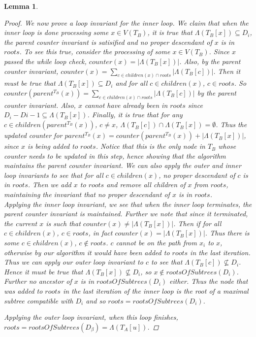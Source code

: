 \documentclass{article}
\newcommand{\leafset}{\Lambda}
\newtheorem{computerootsofsubtreescorrectness}[incompatibility]{Lemma}
\begin{document}
\begin{computerootsofsubtreescorrectness}
\begin{proof}
            We now prove a loop invariant for the inner loop. We claim that when the inner loop is done processing some $x \in V(T_B)$, it is true that $\leafset(T_B[x]) \subseteq D_i$, the parent counter invariant is satisified and no proper descendant of $x$ is in $roots$. To see this true, consider the processing of some $x \in V(T_B)$. Since $x$ passed the while loop check, $counter(x) = |\leafset(T_B[x])|$. Also, by the parent counter invariant, $counter(x) = \sum_{c \in children(x) \cap roots} |\leafset(T_B[c])|$. Then it must be true that $\leafset(T_B[x]) \subseteq D_i$ and for all $c \in children(x)$, $c \in roots$. So $counter(parent^{T_B}(x)) = \sum_{c \in children(x) \cap roots} |\leafset(T_B[c])|$ by the parent counter invariant. Also, $x$ cannot have already been in $roots$ since $D_i - D{i-1} \subseteq \leafset(T_B[x])$. Finally, it is true that for any $c \in children(parent^{T_B}(x))$, $c \neq x$, $\leafset(T_B[c]) \cap \leafset(T_B[x]) = \emptyset$. Thus the updated counter for $parent^{T_B}(x) = counter(parent^{T_B}(x)) + |\leafset(T_B[x])|$, since $x$ is being added to $roots$. Notice that this is the only node in $T_B$ whose counter needs to be updated in this step, hence showing that the algorithm maintains the parent counter invariant. We can also apply the outer and inner loop invariants to see that for all $c \in children(x)$, no proper descendant of $c$ is in $roots$. Then we add $x$ to $roots$ and remove all children of $x$ from $roots$, maintaining the invariant that no proper descendant of $x$ is in $roots$.\\

            Applying the inner loop invariant, we see that when the inner loop terminates, the parent counter invariant is maintained. Further we note that since it terminated, the current $x$ is such that $counter(x) \neq |\leafset(T_B[x])|$. Then if for all $c \in children(x)$, $c \in roots$, in fact $counter(x) = |\leafset(T_B[x])|$. Thus there is some $c \in children(x)$, $c \not\in roots$. $c$ cannot be on the path from $x_i$ to $x$, otherwise by our algorithm it would have been added to $roots$ in the last iteration. Thus we can apply our outer loop invariant to $c$ to see that $\leafset(T_B[c]) \not\subseteq D_i$. Hence it must be true that $\leafset(T_B[x]) \not\subseteq D_i$, so $x \not\in rootsOfSubtrees(D_i)$. Further no ancestor of $x$ is in $rootsOfSubtrees(D_i)$ either. Thus the node that was added to $roots$ in the last iteration of the inner loop is the root of a maximal subtree compatible with $D_i$ and so $roots = rootsOfSubtrees(D_i)$.

            Applying the outer loop invariant, when this loop finishes, $roots = rootsOfSubtrees(D_{\beta}) = \leafset(T_A[u])$.
        \end{proof}
    \end{computerootsofsubtreescorrectness}
\end{document}

